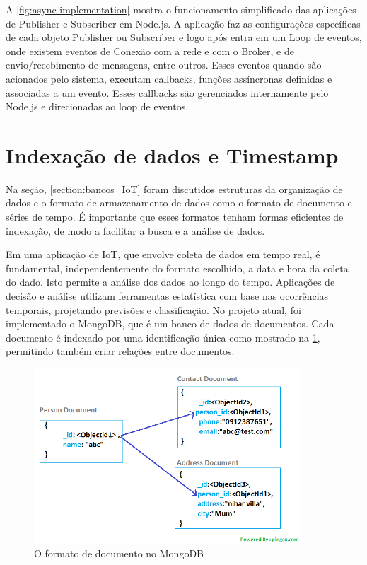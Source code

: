 A \ref{fig:async-implementation} mostra o funcionamento simplificado das aplicações de Publisher e Subscriber em Node.js. A aplicação faz as configurações específicas de cada objeto Publisher ou Subscriber e logo após entra em um Loop de eventos, onde existem eventos de Conexão com a rede e com o Broker, e de envio/recebimento de mensagens, entre outros. Esses eventos quando são acionados pelo sistema, executam callbacks, funções assíncronas definidas e associadas a um evento. Esses callbacks são gerenciados internamente pelo Node.js e direcionadas ao loop de eventos.

\section{Indexação de dados e Timestamp}
\label{section:timestamp}

Na seção, \ref{section:bancos_IoT} foram discutidos estruturas da organização de dados e o formato de armazenamento de dados como o formato de documento e séries de tempo. É importante que esses formatos tenham formas eficientes de indexação, de modo a facilitar a busca e a análise de dados.

Em uma aplicação de IoT, que envolve coleta de dados em tempo real, é fundamental, independentemente do formato escolhido, a data e hora da coleta do dado. Isto permite a análise dos dados ao longo do tempo. Aplicações de decisão e análise utilizam ferramentas estatística com base nas ocorrências temporais, projetando previsões e classificação. No projeto atual, foi implementado o MongoDB, que é um banco de dados de documentos. Cada documento é indexado por uma identificação única como mostrado na \ref{fig:document-model}, permitindo também criar relações entre documentos.

\begin{figure}[h!]
\centering
\includegraphics[width=10cm]{./02_Capitulos/02_Cap3/figures/document-model}
\caption{O formato de documento no MongoDB}
\label{fig:document-model}
\end{figure}

